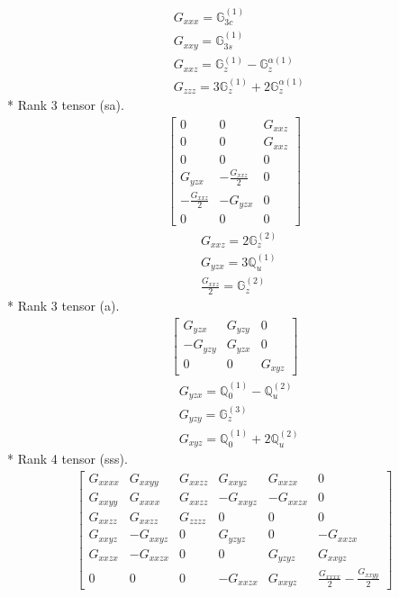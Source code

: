\documentclass[fleqn,8pt,landscape]{jsarticle}
\begin{document}
\begin{align*}
& G_{xxx} = \mathbb{G}_{3c}^{(1)} \\
& G_{xxy} = \mathbb{G}_{3s}^{(1)} \\
& G_{xxz} = \mathbb{G}_{z}^{(1)} - \mathbb{G}_{z}^{\alpha(1)} \\
& G_{zzz} = 3 \mathbb{G}_{z}^{(1)} + 2 \mathbb{G}_{z}^{\alpha(1)}
\end{align*}
* Rank 3 tensor (sa).
\begin{align*}
\begin{bmatrix} 0 & 0 & G_{xxz} \\ 0 & 0 & G_{xxz} \\ 0 & 0 & 0 \\ G_{yzx} & - \frac{G_{xxz}}{2} & 0 \\ - \frac{G_{xxz}}{2} & - G_{yzx} & 0 \\ 0 & 0 & 0 \end{bmatrix}
\end{align*}
\begin{align*}
& G_{xxz} = 2 \mathbb{G}_{z}^{(2)} \\
& G_{yzx} = 3 \mathbb{Q}_{u}^{(1)} \\
& \frac{G_{xxz}}{2} = \mathbb{G}_{z}^{(2)}
\end{align*}
* Rank 3 tensor (a).
\begin{align*}
\begin{bmatrix} G_{yzx} & G_{yzy} & 0 \\ - G_{yzy} & G_{yzx} & 0 \\ 0 & 0 & G_{xyz} \end{bmatrix}
\end{align*}
\begin{align*}
& G_{yzx} = \mathbb{Q}_{0}^{(1)} - \mathbb{Q}_{u}^{(2)} \\
& G_{yzy} = \mathbb{G}_{z}^{(3)} \\
& G_{xyz} = \mathbb{Q}_{0}^{(1)} + 2 \mathbb{Q}_{u}^{(2)}
\end{align*}
* Rank 4 tensor (sss).
\begin{align*}
\begin{bmatrix} G_{xxxx} & G_{xxyy} & G_{xxzz} & G_{xxyz} & G_{xxzx} & 0 \\ G_{xxyy} & G_{xxxx} & G_{xxzz} & - G_{xxyz} & - G_{xxzx} & 0 \\ G_{xxzz} & G_{xxzz} & G_{zzzz} & 0 & 0 & 0 \\ G_{xxyz} & - G_{xxyz} & 0 & G_{yzyz} & 0 & - G_{xxzx} \\ G_{xxzx} & - G_{xxzx} & 0 & 0 & G_{yzyz} & G_{xxyz} \\ 0 & 0 & 0 & - G_{xxzx} & G_{xxyz} & \frac{G_{xxxx}}{2} - \frac{G_{xxyy}}{2} \end{bmatrix}
\end{align*}
\end{document}
